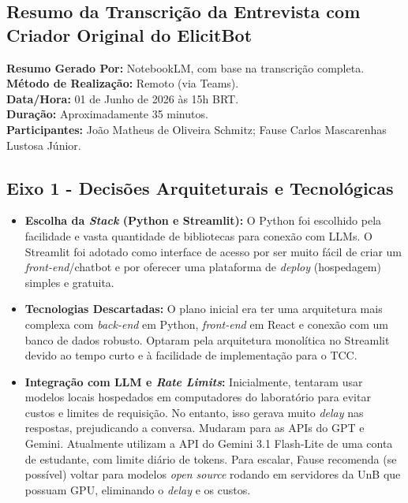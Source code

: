 \begin{apendicesenv}

\chapter{Resumo da Transcrição da Entrevista com Criador Original do ElicitBot}
\label{apendice:resumo_entrevista}

\noindent\textbf{Resumo Gerado Por:} NotebookLM, com base na transcrição completa.\\
\textbf{Método de Realização:} Remoto (via Teams).\\
\textbf{Data/Hora:} 01 de Junho de 2026 às 15h BRT.\\
\textbf{Duração:} Aproximadamente 35 minutos.\\
\textbf{Participantes:} João Matheus de Oliveira Schmitz; Fause Carlos Mascarenhas Lustosa Júnior.

\section*{Eixo 1 - Decisões Arquiteturais e Tecnológicas}

\begin{itemize}
  \item \textbf{Escolha da \textit{Stack} (Python e Streamlit):} O Python foi escolhido pela facilidade e vasta quantidade de bibliotecas para conexão com LLMs. O Streamlit foi adotado como interface de acesso por ser muito fácil de criar um \textit{front-end}/chatbot e por oferecer uma plataforma de \textit{deploy} (hospedagem) simples e gratuita.
  \item \textbf{Tecnologias Descartadas:} O plano inicial era ter uma arquitetura mais complexa com \textit{back-end} em Python, \textit{front-end} em React e conexão com um banco de dados robusto. Optaram pela arquitetura monolítica no Streamlit devido ao tempo curto e à facilidade de implementação para o TCC.
  \item \textbf{Integração com LLM e \textit{Rate Limits}:} Inicialmente, tentaram usar modelos locais hospedados em computadores do laboratório para evitar custos e limites de requisição. No entanto, isso gerava muito \textit{delay} nas respostas, prejudicando a conversa. Mudaram para as APIs do GPT e Gemini. Atualmente utilizam a API do Gemini 3.1 Flash-Lite de uma conta de estudante, com limite diário de tokens. Para escalar, Fause recomenda (se possível) voltar para modelos \textit{open source} rodando em servidores da UnB que possuam GPU, eliminando o \textit{delay} e os custos.
\end{itemize}


\end{apendicesenv}
